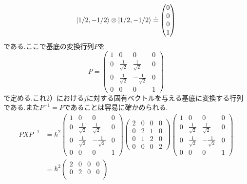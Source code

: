 \documentclass[uplatex,dvipdfmx, a4paper,11pt]{jsarticle}
\begin{document}
\begin{enumerate}[1.]
\begin{enumerate}[1）]
\begin{gather*}
            \ket{1/2,-1/2}\otimes \ket{1/2,-1/2}\doteq \begin{pmatrix}
                0\\0\\0\\1
            \end{pmatrix}            
        \end{gather*}
        である.ここで基底の変換行列$P$を
        \begin{equation}
            P=\begin{pmatrix}
                1&0&0&0\\
                0&\frac{1}{\sqrt{2}}&\frac{1}{\sqrt{2}}&0\\
                0&\frac{1}{\sqrt{2}}&-\frac{1}{\sqrt{2}}&0\\
                0&0&0&1
            \end{pmatrix}
        \end{equation}
        で定める.これ2）における$j$に対する固有ベクトルを与える基底に変換する行列である.また$P^{-1}=P$であることは容易に確かめられる.
        \begin{align*}
            PXP^{-1}&=\hbar^2\begin{pmatrix}
                1&0&0&0\\
                0&\frac{1}{\sqrt{2}}&\frac{1}{\sqrt{2}}&0\\
                0&\frac{1}{\sqrt{2}}&-\frac{1}{\sqrt{2}}&0\\
                0&0&0&1
            \end{pmatrix}\begin{pmatrix}
                2&0&0&0\\
                0&2&1&0\\
                0&1&2&0\\
                0&0&0&2
            \end{pmatrix}\begin{pmatrix}
                1&0&0&0\\
                0&\frac{1}{\sqrt{2}}&\frac{1}{\sqrt{2}}&0\\
                0&\frac{1}{\sqrt{2}}&-\frac{1}{\sqrt{2}}&0\\
                0&0&0&1
            \end{pmatrix}\\
            &=\hbar^2\begin{pmatrix}
                2&0&0&0\\
                0&2&0&0\\

\end{pmatrix}
\end{align*}
\end{enumerate}
\end{enumerate}
\end{document}
